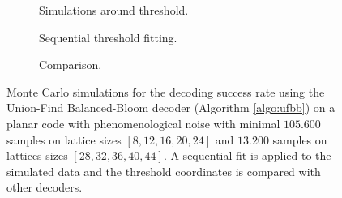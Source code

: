 \begin{figure}[htbp]
  \centering
  \begin{subfigure}[b]{0.49\textwidth}
    \begin{adjustbox}{Clip=0 1em 0 0}
      
    \end{adjustbox}
    \caption{Simulations around threshold.}
  \end{subfigure}
  \begin{subfigure}[b]{0.49\textwidth}
    \begin{adjustbox}{Clip=0 1em 0 0}
      
    \end{adjustbox}
    \caption{Sequential threshold fitting.}
  \end{subfigure}
  \begin{subfigure}[b]{\textwidth}
    \begin{adjustbox}{Clip=0 1em 0 0}
    
    \end{adjustbox}
    \caption{Comparison.}
  \end{subfigure}
  \caption{Monte Carlo simulations for the decoding success rate using the Union-Find Balanced-Bloom decoder (Algorithm \ref{algo:ufbb}) on a planar code with phenomenological noise with minimal $105.600$ samples on lattice sizes $[8,12,16,20,24]$ and $13.200$ samples on lattices sizes $[28, 32, 36, 40, 44]$. A sequential fit is applied to the simulated data and the threshold coordinates is compared with other decoders.}
  \label{fig:thres_ufbb_planar_3d}
\end{figure}


